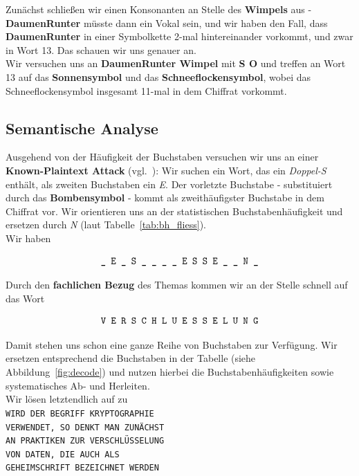 \noindent
Zunächst schließen wir einen Konsonanten an Stelle des \textbf{Wimpels} aus - \textbf{DaumenRunter} müsste dann ein Vokal sein, und wir haben den Fall, dass \textbf{DaumenRunter} in einer Symbolkette 2-mal hintereinander vorkommt, und zwar in Wort 13.
Das schauen wir uns genauer an.\\
Wir versuchen uns an \textbf{DaumenRunter Wimpel} mit \textbf{S O} und treffen an Wort 13 auf das \textbf{Sonnensymbol} und das \textbf{Schneeflockensymbol}, wobei das Schneeflockensymbol insgesamt 11-mal in dem Chiffrat vorkommt.

\subsection*{Semantische Analyse}
Ausgehend von der Häufigkeit der Buchstaben versuchen wir uns an einer \textbf{Known-Plaintext Attack} (vgl.~\cite[50]{ITS3}): Wir suchen ein Wort, das ein \textit{Doppel-S} enthält, als zweiten Buchstaben ein \textit{E}.
Der vorletzte Buchstabe - substituiert durch das \textbf{Bombensymbol} - kommt als zweithäufigster Buchstabe in dem Chiffrat vor.
Wir orientieren uns an der statistischen Buchstabenhäufigkeit und ersetzen durch \textit{N} (laut Tabelle~\ref{tab:bh_fliess}).\\

\noindent
Wir haben

\begin{equation}\notag
\texttt{\_ E \_ S \_ \_ \_ \_ E S S E \_ \_ N \_}
\end{equation}

\noindent
Durch den \textbf{fachlichen Bezug} des Themas kommen wir an der Stelle schnell auf das Wort

\begin{equation}\notag
\texttt{V E R S C H L U E S S E L U N G}
\end{equation}

\noindent
Damit stehen uns schon eine ganze Reihe von Buchstaben zur Verfügung.
Wir ersetzen entsprechend die Buchstaben in der Tabelle (siehe Abbildung~\ref{fig:decode}) und nutzen hierbei die Buchstabenhäufigkeiten sowie systematisches Ab- und Herleiten.\\
Wir lösen letztendlich auf zu\\

\noindent
\texttt{WIRD DER BEGRIFF KRYPTOGRAPHIE}\\
\texttt{VERWENDET, SO DENKT MAN ZUNÄCHST}\\
\texttt{AN PRAKTIKEN ZUR VERSCHLÜSSELUNG}\\
\texttt{VON DATEN, DIE AUCH ALS}\\
\texttt{GEHEIMSCHRIFT BEZEICHNET WERDEN}\\

